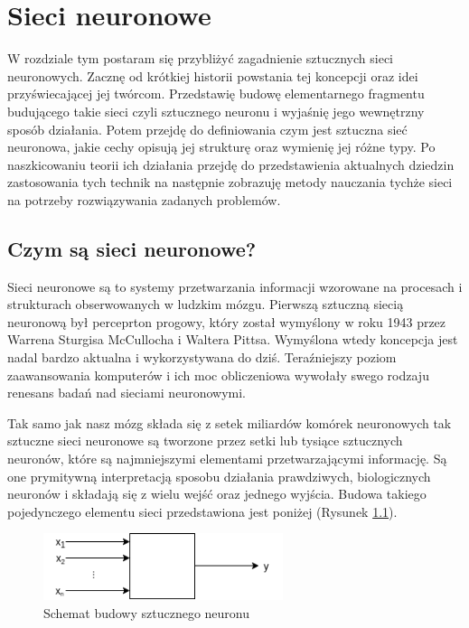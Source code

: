 \documentclass[12pt, oneside, a4paper]{report}
\begin{document}
\chapter{Sieci neuronowe}

W rozdziale tym postaram się przybliżyć zagadnienie sztucznych sieci neuronowych. Zacznę od krótkiej historii powstania tej koncepcji oraz idei przyświecającej jej twórcom. Przedstawię budowę elementarnego fragmentu budującego takie sieci czyli sztucznego neuronu i wyjaśnię jego wewnętrzny sposób działania. Potem przejdę do definiowania czym jest sztuczna sieć neuronowa, jakie cechy opisują jej strukturę oraz wymienię jej różne typy. Po naszkicowaniu teorii ich działania przejdę do przedstawienia aktualnych dziedzin zastosowania tych technik na następnie zobrazuję metody nauczania tychże sieci na potrzeby rozwiązywania zadanych problemów.

\section{Czym są sieci neuronowe?}

Sieci neuronowe są to systemy przetwarzania informacji wzorowane na procesach i strukturach obserwowanych w ludzkim mózgu. Pierwszą sztuczną siecią neuronową był perceprton progowy, który został wymyślony w roku 1943 przez Warrena Sturgisa McCullocha i Waltera Pittsa. Wymyślona wtedy koncepcja jest nadal bardzo aktualna i wykorzystywana do dziś. Teraźniejszy poziom zaawansowania komputerów i ich moc obliczeniowa wywołały swego rodzaju renesans badań nad sieciami neuronowymi.

Tak samo jak nasz mózg składa się z setek miliardów komórek neuronowych tak sztuczne sieci neuronowe są tworzone przez setki lub tysiące sztucznych neuronów, które są najmniejszymi elementami przetwarzającymi informację. Są one prymitywną interpretacją sposobu działania prawdziwych, biologicznych neuronów i składają się z wielu wejść oraz jednego wyjścia. Budowa takiego pojedynczego elementu sieci przedstawiona jest poniżej (Rysunek \ref{fig: 2.1}).

\begin{figure}[h]
	\centering
	\includegraphics[width=7cm]{fig211.png}
	\caption{Schemat budowy sztucznego neuronu}
	\label{fig: 2.1}
\end{figure}
\end{document}
